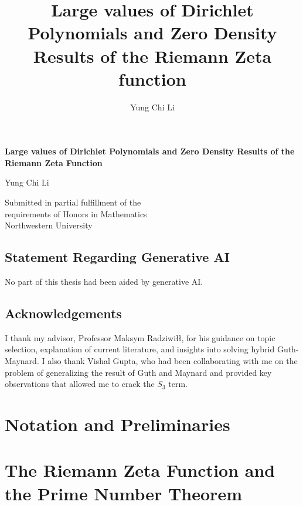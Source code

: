 \documentclass[openany,
ngerman,
toc=flat,
toc=chapterentrywithdots,
captions=tableabove,
listof=entryprefix,
listof=leveldown,
fontsize=12pt,
numbers=noenddot]
{book}
\title{Large values of Dirichlet Polynomials and Zero Density Results of the Riemann Zeta function}
\author{Yung Chi Li}
\date{}
\begin{document}
\begin{titlepage}
    \begin{center}
        \vspace*{1cm}
            
        \Large
        \textbf{Large values of Dirichlet Polynomials and Zero Density Results of the Riemann Zeta Function}
            
        \vspace{0.5cm}
        
        \Large
        Yung Chi Li
            
        \vfill
            
       	Submitted in partial fulfillment of the\\ requirements of
		Honors in Mathematics\\
		
		
		Northwestern University
            
    
            
    \end{center}
\end{titlepage}
\tableofcontents
\section*{Statement Regarding Generative AI}
No part of this thesis had been aided by generative AI.

\section*{Acknowledgements}
I thank my advisor, Professor Maksym Radziwi\l\l, for his guidance on topic selection, explanation of current literature, and insights into solving hybrid Guth-Maynard. 
I also thank Vishal Gupta, who had been collaborating with me on the problem of generalizing the result of Guth and Maynard and provided key observations that allowed 
me to crack the $S_3$ term.
\chapter{Notation and Preliminaries}



	\chapter{ The Riemann Zeta Function and the Prime Number Theorem}
	
	
\end{document}
